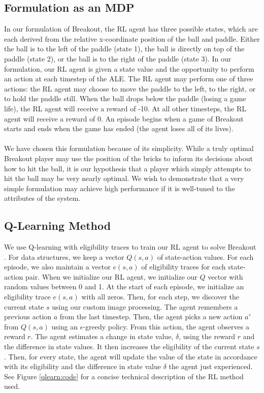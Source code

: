 \documentclass{article}
\begin{document}
\subsection{Formulation as an MDP}
In our formulation of Breakout, the RL agent has three possible states, which are each derived from the relative x-coordinate position of the ball and paddle.  Either the ball is to the left of the paddle (state 1), the ball is directly on top of the paddle (state 2), or the ball is to the right of the paddle (state 3).  In our formulation, our RL agent is given a state value and the opportunity to perform an action at each timestep of the ALE.  The RL agent may perform one of three actions: the RL agent may choose to move the paddle to the left, to the right, or to hold the paddle still.  When the ball drops below the paddle (losing a game life), the RL agent will receive a reward of -10.  At all other timesteps, the RL agent will receive a reward of 0.  An episode begins when a game of Breakout starts and ends when the game has ended (the agent loses all of its lives).
\\\\
We have chosen this formulation because of its simplicity.  While a truly optimal Breakout player may use the position of the bricks to inform its decisions about how to hit the ball, it is our hypothesis that a player which simply attempts to hit the ball may be very nearly optimal.  We wish to demonstrate that a very simple formulation may achieve high performance if it is well-tuned to the attributes of the system.
\subsection{Q-Learning Method}
We use Q-learning with eligibility traces to train our RL agent to solve Breakout \cite{sutton}.  For data structures, we keep a vector $Q(s, a)$ of state-action values.  For each episode, we also maintain a vector $e(s, a)$ of eligibility traces for each state-action pair.  When we initialize our RL agent, we initialize our $Q$ vector with random values between 0 and 1.  At the start of each episode, we initialize an eligibility trace $e(s, a)$ with all zeros.  Then, for each step, we discover the current state $s$ using our custom image processing.  The agent remembers a previous action $a$ from the last timestep.  Then, the agent picks a new action $a'$ from $Q(s, a)$ using an $\epsilon$-greedy policy.  From this action, the agent observes a reward $r$.  The agent estimates a change in state value, $\delta$, using the reward $r$ and the difference in state values.  It then increases the eligibility of the current state $s$.  Then, for every state, the agent will update the value of the state in accordance with its eligibility and the difference in state value $\delta$ the agent just experienced.  See Figure \ref{qlearn:code} for a concise technical description of the RL method used.
\end{document}
